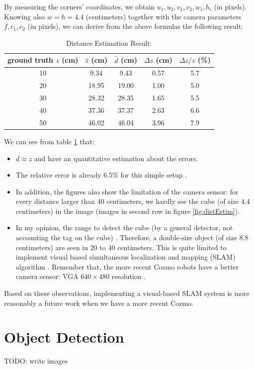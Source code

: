 By measuring the corners' coordinates, we obtain $u_1, u_2, v_1, v_2, w_i, h_i$ (in pixels). Knowing also $w = h = 4.4$ (centimeters) together with the camera parameters $f, c_1, c_2$ (in pixels), we can derive from the above formulas the following result:

\begin{table}[h!]
	\centering
	\begin{tabular}{c|c|c|c|c}
ground truth $z$ (cm) & $\hat{z}$ (cm) & $\hat{d}$ (cm) & $\Delta z$ (cm) & $\Delta z / z$ (\%)\\
\hline
10 & 9.34 & 9.43 & 0.57 & 5.7 \\
20 & 18.95 & 19.00 & 1.00 & 5.0 \\
30 & 28.32 & 28.35 & 1.65 & 5.5 \\
40 & 37.36 & 37.37 & 2.63 & 6.6  \\
50 & 46.02 & 46.04 & 3.96 & 7.9
	\end{tabular}
	\caption{Distance Estimation Result: }
	\label{table:2}
\end{table}

We can see from table \ref{table:2} that:
\begin{itemize} 
	\item $d \approx z$ and have an quantitative estimation about the errors.
	\item The relative error is already $6.5\%$ for this simple setup . 
	\item In addition, the figures also show the limitation of the camera sensor: for every distance larger than 40 centimeters, we hardly see the cube (of size 4.4 centimeters) in the image (images in second row in figure \ref{fig:distEstim}). 
	\item In my opinion, the range to detect the cube (by a general detector, not accounting the tag on the cube) . Therefore, a double-size object (of size 8.8 centimeters) are seen in 20 to 40 centimeters. This is quite limited to implement visual based simultaneous localization and mapping (SLAM) algorithm \cite{wiki:SLAM}. Remember that, the more recent Cozmo robots have a better camera sensor: VGA $640 \times 480$ resolution \cite{cozmoTech}. 
\end{itemize}

Based on these observations, implementing a visual-based SLAM system is more reasonably a future work when we have a more recent Cozmo.

\section{Object Detection}

TODO: write images